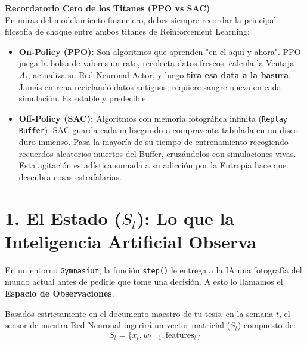 \documentclass[11pt]{article}
\begin{document}
\vspace{1mm}
\noindent\textbf{Recordatorio Cero de los Titanes (PPO vs SAC)}\\
En miras del modelamiento financiero, debes siempre recordar la principal filosofía de choque entre ambos titanes de Reinforcement Learning:
\begin{itemize}
    \item \textbf{On-Policy (PPO):} Son algoritmos que aprenden "en el aquí y ahora". PPO juega la bolsa de valores un rato, recolecta datos frescos, calcula la Ventaja $A_t$, actualiza su Red Neuronal Actor, y luego \textbf{tira esa data a la basura}. Jamás entrena reciclando datos antiguos, requiere sangre nueva en cada simulación. Es estable y predecible.
    \item \textbf{Off-Policy (SAC):} Algoritmos con memoria fotográfica infinita (\texttt{Replay Buffer}). SAC guarda cada milisegundo o compraventa tabulada en un disco duro inmenso. Pasa la mayoría de su tiempo de entrenamiento recogiendo recuerdos aleatorios muertos del Buffer, cruzándolos con simulaciones vivas. Esta agitación estadística sumada a su adicción por la Entropía hace que descubra cosas estrafalarias.
\end{itemize}

\section{1. El Estado ($S_t$): Lo que la Inteligencia Artificial Observa}
En un entorno \texttt{Gymnasium}, la función \texttt{step()} le entrega a la IA una fotografía del mundo actual antes de pedirle que tome una decisión. A esto lo llamamos el \textbf{Espacio de Observaciones}.

Basados estrictamente en el documento maestro de tu tesis, en la semana $t$, el sensor de nuestra Red Neuronal ingerirá un vector matricial ($S_t$) compuesto de:
\begin{equation}
S_t = \{ x_t, w_{t-1}, \text{features}_t \}
\end{equation}
\end{document}
